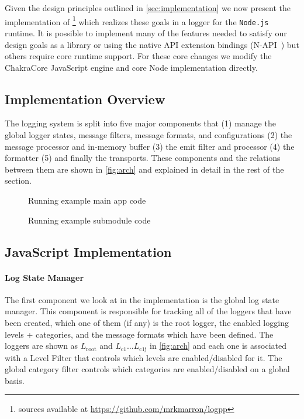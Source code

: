 Given the design principles outlined in \autoref{sec:implementation} we now 
present the implementation of \projn\footnote{\projn sources available at 
\url{https://github.com/mrkmarron/logpp}} which realizes these goals in a logger 
for the \texttt{Node.js}~\cite{Node} runtime. It is possible to implement many 
of the features needed to satisfy our design goals as a library or using the 
native API extension bindings (N-API~\cite{NAPI}) but others require core 
runtime support. For these core changes we modify the ChakraCore JavaScript 
engine and core Node implementation directly.

\subsection{Implementation Overview}
The logging system is split into five major components that (1) manage the 
global logger states, message filters, message formats, and configurations (2) the message processor and in-memory buffer 
(3) the emit filter and processor (4) the formatter (5) and finally the transports. These 
components and the relations between them are shown in \autoref{fig:arch} and 
explained in detail in the rest of the section. 

\begin{figure*}[t]
\begin{minipage}[b]{0.47\textwidth}
     
    \caption{Running example main app code}
    \label{fig:appmain}
\end{minipage}
\begin{minipage}[b]{0.47\textwidth}
    
    \caption{Running example submodule code}
    \label{fig:appsub}
\end{minipage}
\end{figure*}

\subsection{JavaScript Implementation}
\label{subsec:jsimpl}
\paragraph{Log State Manager}
\noindent
The first component we look at in the implementation is the global log state 
manager. This component is responsible for tracking all of the loggers that 
have been created, which one of them (if any) is the root logger, the enabled logging levels + 
categories, and the message formats which have been defined. The loggers are shown as $L_{\text{root}}$ 
and $L_{\text{c1}} \ldots L_{\text{c1j}}$ in  \autoref{fig:arch} and each one is associated with a Level Filter 
that controls which levels are enabled/disabled for it. The global category filter controls which categories are 
enabled/disabled on a global basis.

